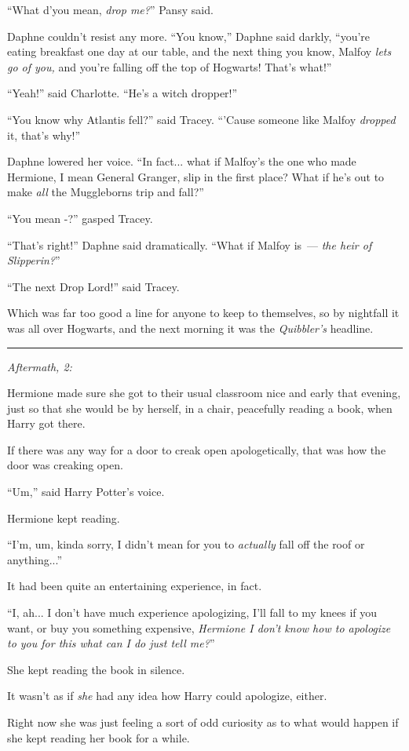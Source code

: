 ``What d'you mean, \emph{drop me?}'' Pansy said.

Daphne couldn't resist any more. ``You know,'' Daphne said darkly, ``you're eating breakfast one day at our table, and the next thing you know, Malfoy \emph{lets go of you,} and you're falling off the top of Hogwarts! That's what!''

``Yeah!'' said Charlotte. ``He's a witch dropper!''

``You know why Atlantis fell?'' said Tracey. ``'Cause someone like Malfoy \emph{dropped} it, that's why!''

Daphne lowered her voice. ``In fact... what if Malfoy's the one who made Hermione, I mean General Granger, slip in the first place? What if he's out to make \emph{all} the Muggleborns trip and fall?''

``You mean -?'' gasped Tracey.

``That's right!'' Daphne said dramatically. ``What if Malfoy is~--- \emph{the heir of Slipperin?}''

``The next Drop Lord!'' said Tracey.

Which was far too good a line for anyone to keep to themselves, so by nightfall it was all over Hogwarts, and the next morning it was the \emph{Quibbler's} headline.

\begin{center}\rule{3in}{0.4pt}\end{center}

\emph{Aftermath, 2:}

Hermione made sure she got to their usual classroom nice and early that evening, just so that she would be by herself, in a chair, peacefully reading a book, when Harry got there.

If there was any way for a door to creak open apologetically, that was how the door was creaking open.

``Um,'' said Harry Potter's voice.

Hermione kept reading.

``I'm, um, kinda sorry, I didn't mean for you to \emph{actually} fall off the roof or anything...''

It had been quite an entertaining experience, in fact.

``I, ah... I don't have much experience apologizing, I'll fall to my knees if you want, or buy you something expensive, \emph{Hermione I don't know how to apologize to you for this what can I do just tell me?}''

She kept reading the book in silence.

It wasn't as if \emph{she} had any idea how Harry could apologize, either.

Right now she was just feeling a sort of odd curiosity as to what would happen if she kept reading her book for a while.
